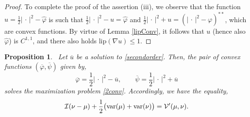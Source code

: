 \documentclass[11pt,letterpaper,reqno]{amsart}
\newtheorem{proposition}[theorem]{Proposition}
\theoremstyle{definition}
\numberwithin{equation}{section}
\def\f{\varphi}
\newcommand{\ov}{\overline}
\newcommand{\var}{{\rm{var}}}
\newcommand{\argu}{{\,\cdot\,}}
\newcommand{\abs}[1]{{\left \lvert #1 \right \rvert}}
\newcommand{\Lip}{{\mathrm{lip}}}
\newcommand{\I}{\mathcal{I}}
\newcommand{\V}{{\mathcal{V}}}
\begin{document}
{\begin{proof}
	To complete the proof of the assertion (iii), we observe 
	that the function $u=\frac{1}{2} \abs{\argu}^2 -\hat\f$ is such that $\frac{1}{2} \abs{\argu}^2- u= \hat\f$ and
	$\frac{1}{2} \abs{\argu}^2+ u=(\abs{\argu}^2-\varphi)^{**}$, which are convex functions. By virtue of Lemma \ref{lipConv}, it follows that $u$ (hence also  $\hat\f$) is $C^{1,1}$, and there also holds  $\Lip(\nabla u)\le 1.$ 
\end{proof}

\begin{proposition}\label{LCP=2convex} \ Let $\ov u$ be a solution to \eqref{secondorder}. Then, the pair of convex functions
	$(\ov\f,\ov\psi)$ given by,
	\begin{equation}\label{ufpsi}
		\ov\f=\frac{1}{2} \abs{\argu}^2 -\ov u, \qquad \ov\psi= \frac{1}{2} \abs{\argu}^2 +\ov u 
	\end{equation}
	solves the maximization problem  \eqref{2conv}.
	Accordingly, we have the equality,
	$$  \I(\nu-\mu) + \frac1{2} \big(\var(\mu)+\var(\nu)\big) = \V'(\mu,\nu).$$
\end{proposition}

}
\end{document}
